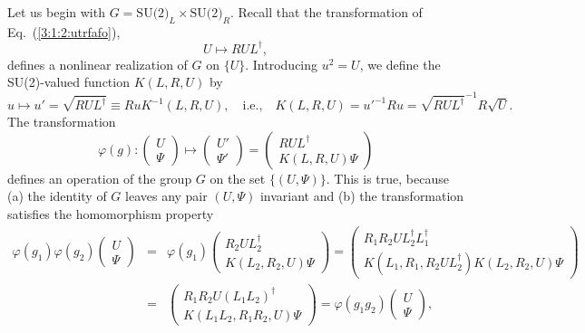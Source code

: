 \documentclass[twoside,12pt]{article}
\begin{document}
   Let us begin with $G=\mbox{SU(2)}_L\times\mbox{SU(2)}_R$.
   Recall that the transformation of Eq.~(\ref{3:1:2:utrfafo}),
\begin{displaymath}
U\mapsto RUL^\dagger,
\end{displaymath}
defines a nonlinear realization of $G$ on $\{U\}$.
   Introducing $u^2=U$, we define the
SU(2)-valued function $K(L,R,U)$ by
\begin{equation}
\label{4:1:1:kdef}
u\mapsto u'=\sqrt{RUL^\dagger}\equiv RuK^{-1}(L,R,U),\quad\mbox{i.e.,}\quad
K(L,R,U)=u'^{-1}Ru=\sqrt{RUL^\dagger}^{-1}R \sqrt{U}.
\end{equation}
   The transformation
\begin{equation}
\label{4:1:1:su2real}
\varphi(g):\left(\begin{array}{c}U\\ \Psi\end{array}\right)\mapsto
\left(\begin{array}{c}U'\\ \Psi'\end{array}\right)
=\left(\begin{array}{c}RUL^\dagger\\K(L,R,U)\Psi\end{array}\right)
\end{equation}
defines an operation of the group $G$ on the set $\{(U,\Psi)\}$.
   This is true, because (a) the identity of $G$ leaves any pair $(U,\Psi)$ invariant and
(b) the transformation satisfies the homomorphism property
\begin{eqnarray*}
\varphi(g_1)\varphi(g_2)
\left(\begin{array}{c}U\\ \Psi\end{array}\right)&=&\varphi(g_1)
\left(\begin{array}{c}R_2UL_2^\dagger\\K(L_2,R_2,U)\Psi\end{array}\right)
=\left(\begin{array}{c}R_1R_2UL_2^\dagger L_1^\dagger\\
K(L_1,R_1,R_2UL_2^\dagger)K(L_2,R_2,U)\Psi
\end{array}\right)\\
&=&\left(\begin{array}{c}R_1 R_2U(L_1L_2)^\dagger\\
K(L_1L_2,R_1R_2,U)\Psi\end{array}\right)=\varphi(g_1g_2)\left(\begin{array}{c}U\\ \Psi\end{array}\right),
\end{eqnarray*}
\end{document}
